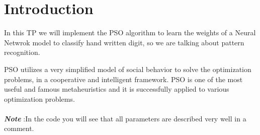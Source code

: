 

\section*{Introduction}

In this TP we will implement the PSO algorithm to learn the weights of a Neural Netwrok model to classify hand written digit, so we are talking about pattern recognition.


PSO utilizes a very simplified model of social behavior to solve the optimization problems, in a cooperative and intelligent framework. PSO is one of the most useful and famous metaheuristics and it is successfully applied to various optimization problems.\\ \\

\textit{\textbf{Note}} :In the code you will see that all parameters are described very well in a comment.
